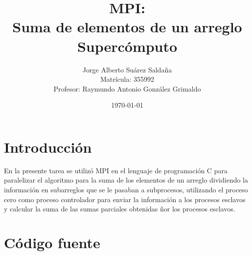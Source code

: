\documentclass[12pt,a4paper]{article}
\title{
    MPI:\\[0.3em]
    \textbf{Suma de elementos de un arreglo}\\[0.5em]
    \large Supercómputo
}
\author{
    Jorge Alberto Suárez Saldaña\\
    \small Matrícula: 355992\\
    \small Profesor: Raymundo Antonio González Grimaldo
}
\date{\today}
\begin{document}
\maketitle

\section{Introducción}
En la presente tarea se utilizó MPI en el lenguaje de programación C para paralelizar el algoritmo para la suma de los elementos de un arreglo dividiendo la información en subarreglos que se le pasaban a subprocesos, utilizando el proceso cero como proceso controlador para enviar la información a los procesos esclavos y calcular la suma de las sumas parciales obtenidas ñor los procesos esclavos.

\section{Código fuente}
\end{document}
